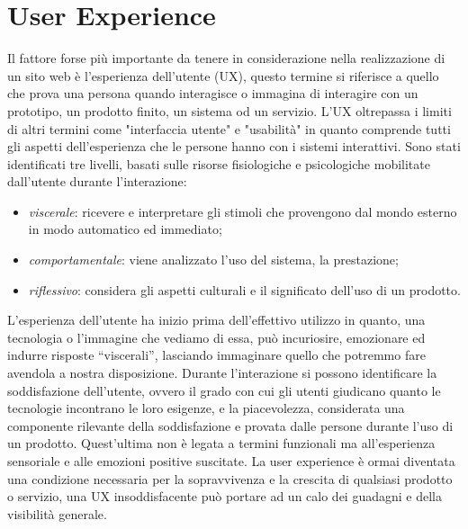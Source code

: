 \documentclass[target=bach,aauheader=]{thud}
\begin{document}
\section{User Experience}
Il fattore forse più importante da tenere in considerazione nella realizzazione di un sito web è l'esperienza dell'utente (UX), questo termine si riferisce a quello che prova una persona quando interagisce o immagina di interagire con un prototipo, un prodotto finito, un sistema od un servizio.
L'UX oltrepassa i limiti di altri termini come "interfaccia utente" e "usabilità" in quanto comprende tutti gli aspetti dell'esperienza che le persone hanno con i sistemi interattivi.
\newline 
Sono stati identificati tre livelli, basati sulle risorse fisiologiche e psicologiche mobilitate dall'utente durante l'interazione:
\begin{itemize}
    \item \textit{viscerale}: ricevere e interpretare gli stimoli che provengono dal mondo esterno in modo automatico ed immediato;
    \item \textit{comportamentale}: viene analizzato l'uso del sistema, la prestazione;
    \item \textit{riflessivo}: considera gli aspetti culturali e il significato dell'uso di un prodotto.
\end{itemize}
L'esperienza dell'utente ha inizio prima dell'effettivo utilizzo in quanto, una tecnologia o l'immagine che vediamo di essa, può incuriosire, emozionare ed indurre risposte “viscerali”, lasciando immaginare quello che potremmo fare avendola a nostra disposizione.
Durante l'interazione si possono identificare la soddisfazione dell'utente, ovvero il grado con cui gli utenti giudicano quanto le tecnologie incontrano le loro esigenze, e la piacevolezza, considerata una componente rilevante della soddisfazione e provata dalle persone durante l'uso di un prodotto.
Quest'ultima non è legata a termini funzionali ma all'esperienza sensoriale e alle emozioni positive suscitate. 
\newline
La user experience è ormai diventata una condizione necessaria per la sopravvivenza e la crescita di qualsiasi prodotto o servizio, una UX insoddisfacente può portare ad un calo dei guadagni e della visibilità generale.

\end{document}
